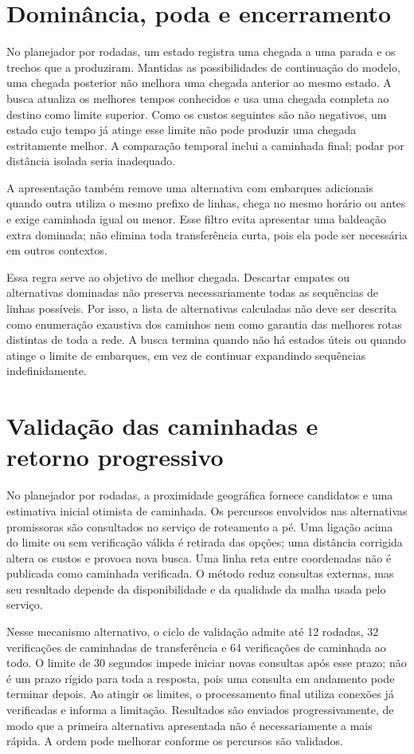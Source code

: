 \documentclass[12pt,oneside,a4paper,brazil,chapter=TITLE]{abntex2}
\let\papsection\section
\renewcommand{\section}{\clearpage\papsection}
\begin{document}
\begin{apendicesenv}
\section{Dominância, poda e encerramento}
No planejador por rodadas, um estado registra uma chegada a uma parada e os trechos que a produziram. Mantidas as possibilidades de continuação do modelo, uma chegada posterior não melhora uma chegada anterior ao mesmo estado. A busca atualiza os melhores tempos conhecidos e usa uma chegada completa ao destino como limite superior. Como os custos seguintes são não negativos, um estado cujo tempo já atinge esse limite não pode produzir uma chegada estritamente melhor. A comparação temporal inclui a caminhada final; podar por distância isolada seria inadequado.

A apresentação também remove uma alternativa com embarques adicionais quando outra utiliza o mesmo prefixo de linhas, chega no mesmo horário ou antes e exige caminhada igual ou menor. Esse filtro evita apresentar uma baldeação extra dominada; não elimina toda transferência curta, pois ela pode ser necessária em outros contextos.

Essa regra serve ao objetivo de melhor chegada. Descartar empates ou alternativas dominadas não preserva necessariamente todas as sequências de linhas possíveis. Por isso, a lista de alternativas calculadas não deve ser descrita como enumeração exaustiva dos caminhos nem como garantia das melhores rotas distintas de toda a rede. A busca termina quando não há estados úteis ou quando atinge o limite de embarques, em vez de continuar expandindo sequências indefinidamente.

\section{Validação das caminhadas e retorno progressivo}
No planejador por rodadas, a proximidade geográfica fornece candidatos e uma estimativa inicial otimista de caminhada. Os percursos envolvidos nas alternativas promissoras são consultados no serviço de roteamento a pé. Uma ligação acima do limite ou sem verificação válida é retirada das opções; uma distância corrigida altera os custos e provoca nova busca. Uma linha reta entre coordenadas não é publicada como caminhada verificada. O método reduz consultas externas, mas seu resultado depende da disponibilidade e da qualidade da malha usada pelo serviço.

Nesse mecanismo alternativo, o ciclo de validação admite até 12 rodadas, 32 verificações de caminhadas de transferência e 64 verificações de caminhada ao todo. O limite de 30 segundos impede iniciar novas consultas após esse prazo; não é um prazo rígido para toda a resposta, pois uma consulta em andamento pode terminar depois. Ao atingir os limites, o processamento final utiliza conexões já verificadas e informa a limitação. Resultados são enviados progressivamente, de modo que a primeira alternativa apresentada não é necessariamente a mais rápida. A ordem pode melhorar conforme os percursos são validados.



\end{apendicesenv}
\end{document}
